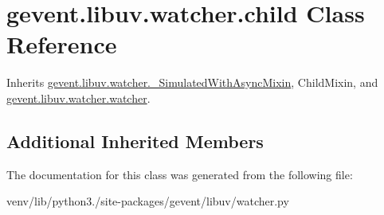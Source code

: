 \hypertarget{classgevent_1_1libuv_1_1watcher_1_1child}{}\section{gevent.\+libuv.\+watcher.\+child Class Reference}
\label{classgevent_1_1libuv_1_1watcher_1_1child}


Inherits \hyperlink{classgevent_1_1libuv_1_1watcher_1_1___simulated_with_async_mixin}{gevent.\+libuv.\+watcher.\+\_\+\+Simulated\+With\+Async\+Mixin}, Child\+Mixin, and \hyperlink{classgevent_1_1libuv_1_1watcher_1_1watcher}{gevent.\+libuv.\+watcher.\+watcher}.

\subsection*{Additional Inherited Members}


The documentation for this class was generated from the following file\+:\begin{DoxyCompactItemize}
\item 
venv/lib/python3./site-\/packages/gevent/libuv/watcher.\+py\end{DoxyCompactItemize}
